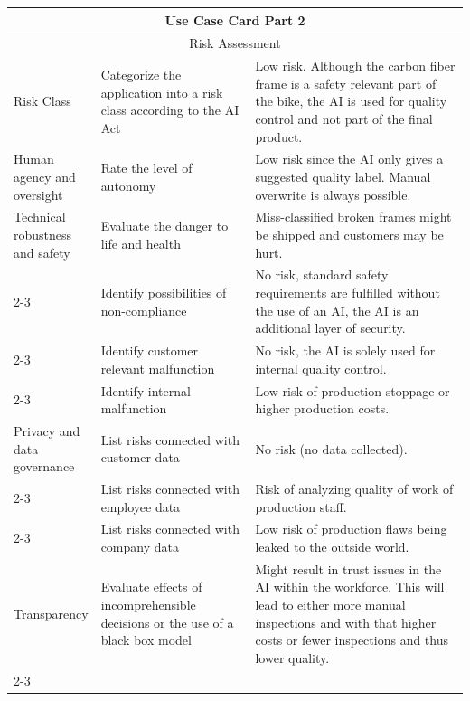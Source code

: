 \newpage
{\small
\begin{longtable}{p{0.15\linewidth}|p{0.35\linewidth}p{0.5\linewidth}}  
    \toprule
    \multicolumn{3}{c}{\bf{Use Case Card Part 2}}\\
    \toprule
    \multicolumn{3}{c}{Risk Assessment} \\
    \hline
    \hline
    Risk Class          
        & Categorize the application into a risk class according to the AI Act & Low risk. Although the carbon fiber frame is a safety relevant part of the bike, the AI is used for quality control and not part of the final product.\\
        
    \hline
    Human agency and oversight 
        & Rate the level of autonomy & Low risk since the AI only gives a suggested quality label. Manual overwrite is always possible. \\
        
    \hline
    Technical robustness and safety 
        & Evaluate the danger to life and health & Miss-classified broken frames might be shipped and customers may be hurt. \\\cline{2-3}  
        & Identify possibilities of non-compliance & No risk, standard safety requirements are fulfilled without the use of an AI, the AI is an additional layer of security. \\\cline{2-3}  
        & Identify customer relevant malfunction & No risk, the AI is solely used for internal quality control. \\\cline{2-3}  
        & Identify internal malfunction & Low risk of production stoppage or higher production costs. \\
        
    \hline
    Privacy and data governance     
        & List risks connected with customer data & No risk (no data collected). \\\cline{2-3}  
        & List risks connected with employee data & Risk of analyzing quality of work of production staff. \\\cline{2-3}  
        & List risks connected with company data & Low risk of production flaws being leaked to the outside world. \\
        
    \hline
    Transparency                    
        & Evaluate effects of incomprehensible decisions or the use of a black box model & Might result in trust issues in the AI within the workforce.                                 This will lead to either more manual inspections and with that higher costs or fewer inspections and thus lower quality.  \\\cline{2-3}  
        

\end{longtable}}
